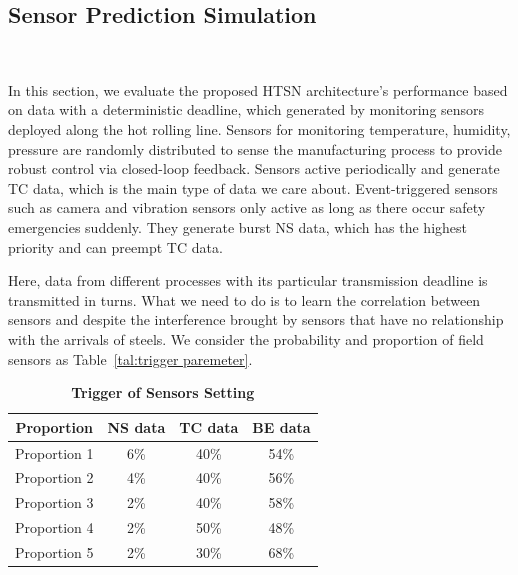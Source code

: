 \documentclass{SCIS2021}
\begin{document}
	\subsection{Sensor Prediction Simulation}~{}
	\par In this section, we evaluate the proposed HTSN architecture's performance based on data with a deterministic deadline, which generated by monitoring sensors deployed along the hot rolling line. Sensors for monitoring temperature, humidity, pressure are randomly distributed to sense the manufacturing process to provide robust control via closed-loop feedback. Sensors active periodically and generate TC data, which is the main type of data we care about. Event-triggered sensors such as camera and vibration sensors only active as long as there occur safety emergencies suddenly. They generate burst NS data, which has the highest priority and can preempt TC data.
	\par Here, data from different processes with its particular transmission deadline is transmitted in turns. What we need to do is to learn the correlation between sensors and despite the interference brought by sensors that have no relationship with the arrivals of steels. We consider the probability and proportion of field sensors as Table~\ref{tal:trigger paremeter}.
	\begin{table}[b]
		\footnotesize
		\caption{\textbf{Trigger of Sensors Setting}}
		\label{tal:trigger paremeter}
		\label{tab1}
		\tabcolsep 38pt %
		\begin{tabular*}{\textwidth}{cccc}
			\toprule
			\textbf{Proportion} & \textbf{NS data} & \textbf{TC data} & \textbf{BE data}\\\hline
			Proportion 1 & 6\% & 40\% & 54\% \\
			Proportion 2 & 4\% & 40\% & 56\% \\
			Proportion 3 & 2\% & 40\% & 58\% \\
			Proportion 4 & 2\% & 50\% & 48\% \\
			Proportion 5 & 2\% & 30\% & 68\% \\
			\bottomrule
		\end{tabular*}
	\end{table}
\end{document}
